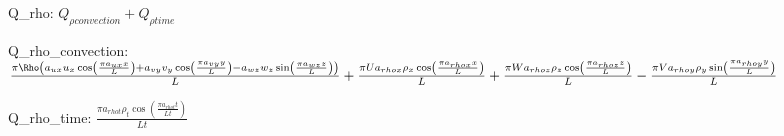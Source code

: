 
 Q_rho: 
$Q_{\rho convection} + Q_{\rho time}$

 Q_rho_convection: 
$\frac{\pi \Rho \left(a_{ux} u_{x} \operatorname{cos}\left(\frac{\pi a_{ux} x}{L}\right) + a_{vy} v_{y} \operatorname{cos}\left(\frac{\pi a_{vy} y}{L}\right) - a_{wz} w_{z} \operatorname{sin}\left(\frac{\pi a_{wz} z}{L}\right)\right)}{L} + \frac{\pi U a_{rhox} \rho_{x} \operatorname{cos}\left(\frac{\pi a_{rhox} x}{L}\right)}{L} + \frac{\pi W a_{rhoz} \rho_{z} \operatorname{cos}\left(\frac{\pi a_{rhoz} z}{L}\right)}{L} - \frac{\pi V a_{rhoy} \rho_{y} \operatorname{sin}\left(\frac{\pi a_{rhoy} y}{L}\right)}{L}$

 Q_rho_time: 
$\frac{\pi a_{rhot} \rho_{t} \operatorname{cos}\left(\frac{\pi a_{rhot} t}{Lt}\right)}{Lt}$